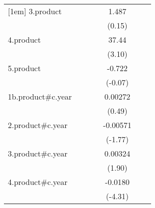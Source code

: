 {\begin{tabular}{l*{6}{c}}
[1em]
3.product           &                     &                     &                     &       1.487         &                     &                     \\
                    &                     &                     &                     &      (0.15)         &                     &                     \\
[1em]
4.product           &                     &                     &                     &       37.44\sym{**} &                     &                     \\
                    &                     &                     &                     &      (3.10)         &                     &                     \\
[1em]
5.product           &                     &                     &                     &      -0.722         &                     &                     \\
                    &                     &                     &                     &     (-0.07)         &                     &                     \\
[1em]
1b.product#c.year   &                     &                     &                     &     0.00272         &                     &                     \\
                    &                     &                     &                     &      (0.49)         &                     &                     \\
[1em]
2.product#c.year    &                     &                     &                     &    -0.00571         &                     &                     \\
                    &                     &                     &                     &     (-1.77)         &                     &                     \\
[1em]
3.product#c.year    &                     &                     &                     &     0.00324         &                     &                     \\
                    &                     &                     &                     &      (1.90)         &                     &                     \\
[1em]
4.product#c.year    &                     &                     &                     &     -0.0180\sym{***}&                     &                     \\
                    &                     &                     &                     &     (-4.31)         &                     &                     \\

\end{tabular}}
